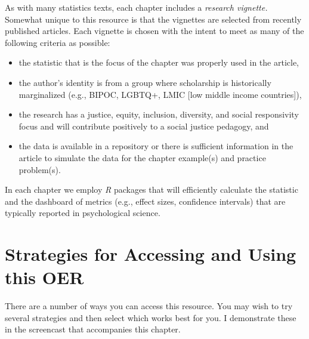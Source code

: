\documentclass[
  english,
]{book}
\providecommand{\tightlist}{%
  \setlength{\itemsep}{0pt}\setlength{\parskip}{0pt}}
\begin{document}
As with many statistics texts, each chapter includes a \emph{research vignette.} Somewhat unique to this resource is that the vignettes are selected from recently published articles. Each vignette is chosen with the intent to meet as many of the following criteria as possible:

\begin{itemize}
\tightlist
\item
  the statistic that is the focus of the chapter was properly used in the article,
\item
  the author's identity is from a group where scholarship is historically marginalized (e.g., BIPOC, LGBTQ+, LMIC {[}low middle income countries{]}),
\item
  the research has a justice, equity, inclusion, diversity, and social responsivity focus and will contribute positively to a social justice pedagogy, and
\item
  the data is available in a repository or there is sufficient information in the article to simulate the data for the chapter example(s) and practice problem(s).
\end{itemize}

In each chapter we employ \emph{R} packages that will efficiently calculate the statistic and the dashboard of metrics (e.g., effect sizes, confidence intervals) that are typically reported in psychological science.

\hypertarget{strategies-for-accessing-and-using-this-oer}{%
\section{Strategies for Accessing and Using this OER}\label{strategies-for-accessing-and-using-this-oer}}

There are a number of ways you can access this resource. You may wish to try several strategies and then select which works best for you. I demonstrate these in the screencast that accompanies this chapter.
\end{document}
